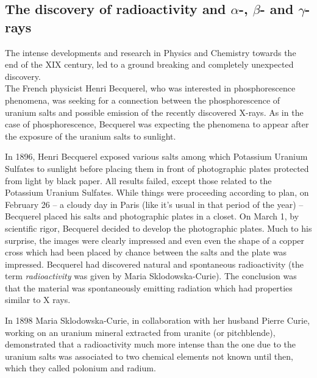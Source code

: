 \subsection{The discovery of radioactivity and $\alpha$-, $\beta$- and $\gamma$-rays}
\label{sec:DiscoveryRadioactivity}

The intense developments and research in Physics and Chemistry towards the end of the XIX century, led to a ground breaking and completely unexpected discovery. \\

The French physicist Henri Becquerel, who was interested in phosphorescence phenomena, was seeking for a connection between the phosphorescence of uranium salts and possible emission of the recently discovered X-rays. As in the case of phosphorescence, Becquerel was expecting the phenomena to appear after the exposure of the uranium salts to sunlight. \\

\begin{framed}

\begin{experiment}


In 1896, Henri Becquerel exposed various salts among which Potassium Uranium Sulfates to sunlight before placing them in front of photographic plates protected from light by black paper. All results failed, except those related to the Potassium Uranium Sulfates. While things were proceeding according to plan, on February 26 -- a cloudy day in Paris (like it's usual in that period of the year) --  Becquerel placed his salts and photographic plates in a closet. On March 1, by scientific rigor, Becquerel decided to develop the photographic plates. Much to his surprise, the images were clearly impressed and even even the shape of a copper cross which had been placed by chance between the salts and the plate was impressed. Becquerel had discovered natural and spontaneous radioactivity (the term \emph{radioactivity} was given by Maria Sklodowska-Curie). The conclusion was that the material was spontaneously emitting radiation which had properties similar to X rays.
\end{experiment}
\end{framed}

In 1898 Maria Sklodowska-Curie, in collaboration with her husband Pierre Curie, working on an uranium mineral extracted from uranite (or pitchblende), demonstrated that a radioactivity much more intense than the one due to the uranium salts was associated to two chemical elements not known until then, which they called polonium and radium. \\

